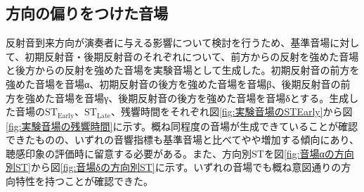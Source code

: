 \documentclass[11pt,a4j]{jreport}
\begin{document}
\subsection{方向の偏りをつけた音場}
反射音到来方向が演奏者に与える影響について検討を行うため、基準音場に対して、初期反射音・後期反射音のそれぞれについて、前方からの反射を強めた音場と後方からの反射を強めた音場を実験音場として生成した。初期反射音の前方を強めた音場を音場α、初期反射音の後方を強めた音場を音場β、後期反射音の前方を強めた音場を音場γ、後期反射音の後方を強めた音場を音場δとする。生成した音場の$\mathrm{ST_{Early}}$、$\mathrm{ST_{Late}}$、残響時間をそれぞれ図\ref{fig:実験音場のSTEarly}から図\ref{fig:実験音場の残響時間}に示す。概ね同程度の音場が生成できていることが確認できたものの、いずれの音響指標も基準音場と比べてやや増加する傾向にあり、聴感印象の評価時に留意する必要がある。また、方向別STを図\ref{fig:音場αの方向別ST}から図\ref{fig:音場δの方向別ST}に示す。いずれの音場でも概ね意図通りの方向特性を持つことが確認できた。
\end{document}
